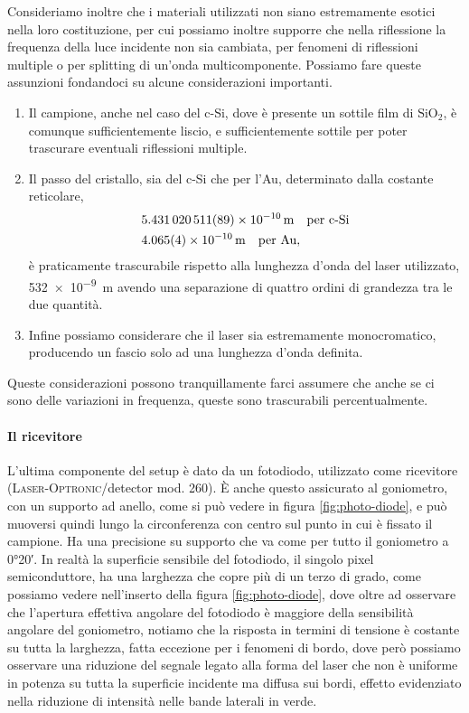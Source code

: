 \documentclass[
    prb,altaffilletter,citeautoscript,
    amsmath,amssymb,
    showpacs,showkeys,floatfix,
    reprint
]{revtex4-1}
\begin{document}
Consideriamo inoltre che i materiali utilizzati non siano estremamente esotici nella loro costituzione, per cui possiamo inoltre supporre che nella riflessione la frequenza della luce incidente non sia cambiata, per fenomeni di riflessioni multiple o per splitting di un'onda multicomponente. Possiamo fare queste assunzioni fondandoci su alcune considerazioni importanti.
\begin{enumerate}
    \item Il campione, anche nel caso del c-Si, dove è presente un sottile film di $\mathrm{SiO_2}$, è comunque sufficientemente liscio, e sufficientemente sottile per poter trascurare eventuali riflessioni multiple. 
    \item Il passo del cristallo, sia del c-Si che per l'Au, determinato dalla costante reticolare,\cite{BasicParametersSilicon2023, CODATAValueLattice, daveyPrecisionMeasurementsLattice1925, MaterialsDataAu2020, MaterialsDataSi2020, NSMArchivePhysical} \begin{align*}
        &\SI{5.431 020 511(89)e-10}{\metre}\quad\text{per c-Si}\\
        &\SI{4.065+-0.004e-10}{\metre}\quad\text{per Au},
    \end{align*} è praticamente trascurabile rispetto alla lunghezza d'onda del laser utilizzato, \SI{532e-9}{\metre} avendo una separazione di quattro ordini di grandezza tra le due quantità.
    \item Infine possiamo considerare che il laser sia estremamente monocromatico, producendo un fascio solo ad una lunghezza d'onda definita. 
\end{enumerate} Queste considerazioni possono tranquillamente farci assumere che anche se ci sono delle variazioni in frequenza, queste sono trascurabili percentualmente. 

\paragraph*{Il ricevitore} L'ultima componente del setup è dato da un fotodiodo, utilizzato come ricevitore (\textsc{Laser-Optronic}/detector mod. 260). È anche questo assicurato al goniometro, con un supporto ad anello, come si può vedere in figura \ref{fig:photo-diode}, e può muoversi quindi lungo la circonferenza con centro sul punto in cui è fissato il campione. Ha una precisione su supporto che va come per tutto il goniometro a \ang{0;20}. In realtà la superficie sensibile del fotodiodo, il singolo pixel semiconduttore, ha una larghezza che copre più di un terzo di grado, come possiamo vedere nell'inserto della figura \ref{fig:photo-diode}, dove oltre ad osservare che l'apertura effettiva angolare del fotodiodo è maggiore della sensibilità angolare del goniometro, notiamo che la risposta in termini di tensione è costante su tutta la larghezza, fatta eccezione per i fenomeni di bordo, dove però possiamo osservare una riduzione del segnale legato alla forma del laser che non è uniforme in potenza su tutta la superficie incidente ma diffusa sui bordi, effetto evidenziato nella riduzione di intensità nelle bande laterali in verde. 
\end{document}
